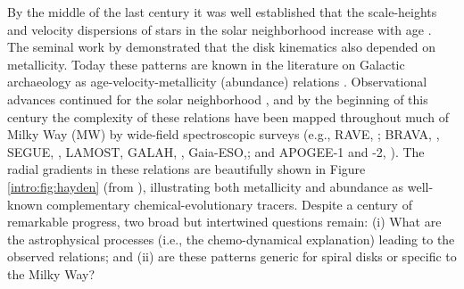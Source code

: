 By the middle of the last century it was well established that the
scale-heights and velocity dispersions of stars in the solar
neighborhood increase with age \citep[see][for a summary of this early
work, particularly the chapters contributed by Elvius and
Delhaye]{Blaauw65}. The seminal work by \citet{Roman50} demonstrated
that the disk kinematics also depended on metallicity.  Today these
patterns are known in the literature on Galactic archaeology as
age-velocity-metallicity (abundance) relations \citep[AVM$\alpha$-R;
e.g.,][]{Aumer09,Minchev14}. Observational advances continued for the
solar neighborhood \citep[e.g.,][]{Edvardsson93, Dehnen98,
  Nordstrom04}, and by the beginning of this century the complexity of
these relations have been mapped throughout much of Milky Way (MW) by
wide-field spectroscopic surveys (e.g., RAVE, \citealt{steinmetz06a};
BRAVA, \citealt{howard08a}, SEGUE, \citealt{yanny09a}, LAMOST,
\citealt{zhao12a} GALAH, \citealt{desilva15a},
Gaia-ESO,\citealt{gilmore12a}; and APOGEE-1 and -2,
\citealt{Majewski15}). The radial gradients in these relations are
beautifully shown in Figure \ref{intro:fig:hayden} (from
\citet{Hayden15}), illustrating both metallicity and abundance as
well-known complementary chemical-evolutionary tracers. Despite a
century of remarkable progress, two broad but intertwined questions
remain: (i) What are the astrophysical processes (i.e., the
chemo-dynamical explanation) leading to the observed relations; and
(ii) are these patterns generic for spiral disks or specific to the
Milky Way?

